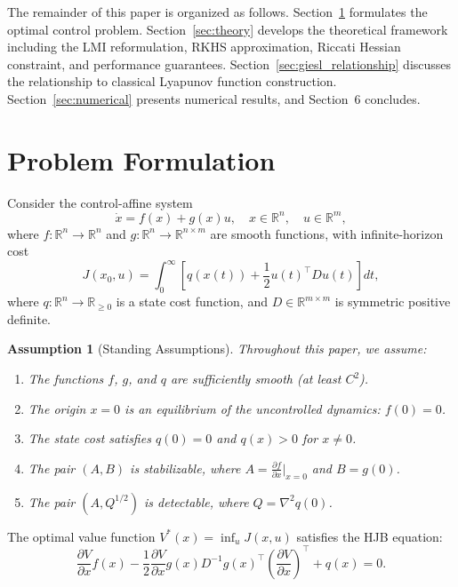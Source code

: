 \documentclass[11pt]{article}
\newtheorem{assumption}[theorem]{Assumption}
\newcommand{\real}{\mathbb{R}}
\begin{document}
The remainder of this paper is organized as follows. Section~\ref{sec:problem} formulates the optimal control problem. Section~\ref{sec:theory} develops the theoretical framework including the LMI reformulation, RKHS approximation, Riccati Hessian constraint, and performance guarantees. Section~\ref{sec:giesl_relationship} discusses the relationship to classical Lyapunov function construction. Section~\ref{sec:numerical} presents numerical results, and Section~6 concludes.

\section{Problem Formulation}
\label{sec:problem}

Consider the control-affine system
\begin{equation}
\dot{x} = f(x) + g(x)u, \quad x \in \real^n, \quad u \in \real^m,
\label{eq:system}
\end{equation}
where $f : \real^n \to \real^n$ and $g : \real^n \to \real^{n \times m}$ are smooth functions, with infinite-horizon cost
\begin{equation}
J(x_0, u) = \int_0^\infty \left[ q(x(t)) + \frac{1}{2}u(t)^\top D u(t) \right] dt,
\label{eq:cost}
\end{equation}
where $q : \real^n \to \real_{\geq 0}$ is a state cost function, and $D \in \real^{m \times m}$ is symmetric positive definite.

\begin{assumption}[Standing Assumptions]
\label{ass:standing}
Throughout this paper, we assume:
\begin{enumerate}
\item The functions $f$, $g$, and $q$ are sufficiently smooth (at least $C^2$).
\item The origin $x = 0$ is an equilibrium of the uncontrolled dynamics: $f(0) = 0$.
\item The state cost satisfies $q(0) = 0$ and $q(x) > 0$ for $x \neq 0$.
\item The pair $(A, B)$ is stabilizable, where $A = \frac{\partial f}{\partial x}\big|_{x=0}$ and $B = g(0)$.
\item The pair $(A, Q^{1/2})$ is detectable, where $Q = \nabla^2 q(0)$.
\end{enumerate}
\end{assumption}

The optimal value function $V^*(x) = \inf_u J(x, u)$ satisfies the HJB equation:
\begin{equation}
\frac{\partial V}{\partial x}f(x) - \frac{1}{2}\frac{\partial V}{\partial x}g(x)D^{-1}g(x)^\top\left(\frac{\partial V}{\partial x}\right)^\top + q(x) = 0.
\label{eq:hjb_equality}
\end{equation}
\end{document}
